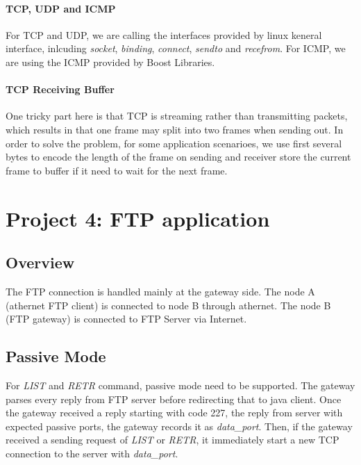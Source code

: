 \documentclass[conference,compsoc]{IEEEtran}
\begin{document}
		\paragraph{\textbf{TCP, UDP and ICMP}}
		For TCP and UDP, we are calling the interfaces provided by linux keneral interface, inlcuding \emph{socket}, \emph{binding}, \emph{connect}, \emph{sendto} and \emph{recefrom}. For ICMP, we are using the ICMP provided by Boost Libraries. 
		\paragraph{\textbf{TCP Receiving Buffer}}
		 One tricky part here is that TCP is streaming rather than transmitting packets, which results in that one frame may split into two frames when sending out. In order to solve the problem, for some application scenarioes, we use first several bytes to encode the length of the frame on sending and receiver store the current frame to buffer if it need to wait for the next frame.
		

\section{Project 4: FTP application}
	\subsection{Overview}	
	The FTP connection is handled mainly at the gateway side. The node A (athernet FTP client) is connected to node B through athernet. The node B (FTP gateway) is connected to FTP Server via Internet.
	\subsection{Passive Mode}
	For \emph{LIST} and \emph{RETR} command, passive mode need to be supported. The gateway parses every reply from FTP server before redirecting that to java client. Once the gateway received a reply starting with code 227, the reply from server with expected passive ports, the gateway records it as \emph{data\_port}. Then, if the gateway received a sending request of \emph{LIST} or \emph{RETR}, it immediately start a new TCP connection to the server with \emph{data\_port}.

\end{document}
